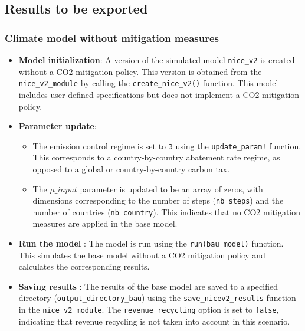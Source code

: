 \documentclass[
]{article}
\begin{document}
\subsection{Results to be exported}\label{results-to-be-exported}

\subsubsection{Climate model without mitigation
measures}\label{climate-model-without-mitigation-measures}

\begin{itemize}
\item
  \textbf{Model initialization}: A version of the simulated model
  \texttt{nice\_v2} is created without a CO2 mitigation policy. This
  version is obtained from the \texttt{nice\_v2\_module} by calling the
  \texttt{create\_nice\_v2()} function. This model includes user-defined
  specifications but does not implement a CO2 mitigation policy.
\item
  \textbf{Parameter update}:

  \begin{itemize}
  \item
    The emission control regime is set to \texttt{3} using the
    \texttt{update\_param!} function. This corresponds to a
    country-by-country abatement rate regime, as opposed to a global or
    country-by-country carbon tax.
  \item
    The \(\mu\_input\) parameter is updated to be an array of zeros,
    with dimensions corresponding to the number of steps
    (\texttt{nb\_steps}) and the number of countries
    (\texttt{nb\_country}). This indicates that no CO2 mitigation
    measures are applied in the base model.
  \end{itemize}
\item
  \textbf{Run the model} : The model is run using the
  \texttt{run(bau\_model)} function. This simulates the base model
  without a CO2 mitigation policy and calculates the corresponding
  results.
\item
  \textbf{Saving results} : The results of the base model are saved to a
  specified directory (\texttt{output\_directory\_bau}) using the
  \texttt{save\_nicev2\_results} function in the
  \texttt{nice\_v2\_module}. The \texttt{revenue\_recycling} option is
  set to \texttt{false}, indicating that revenue recycling is not taken
  into account in this scenario.
\end{itemize}
\end{document}
